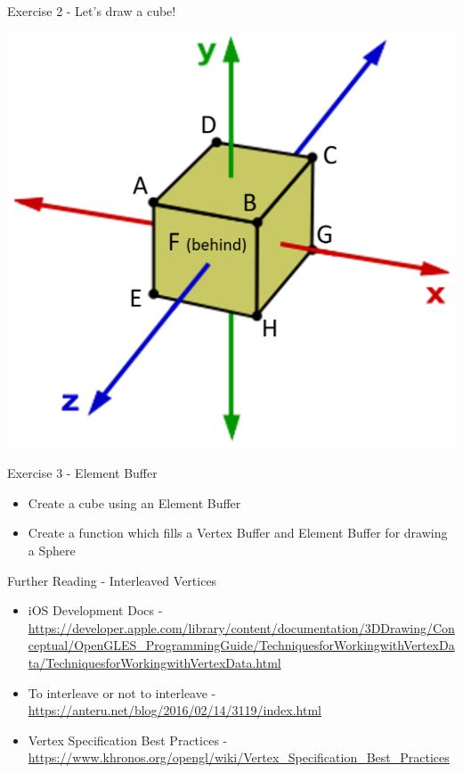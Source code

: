 \begin{frame}{Exercise 2 - Let's draw a cube!}
	\begin{center}
	\includegraphics[height=0.8\textheight]{cube_vertices}
	\end{center}
\end{frame}

\begin{frame}{Exercise 3 - Element Buffer}
	\begin{itemize}
		\item Create a cube using an Element Buffer
		\item Create a function which fills a Vertex Buffer and Element Buffer for drawing a Sphere
	\end{itemize}
\end{frame}

\begin{frame}{Further Reading - Interleaved Vertices}
	\begin{itemize}
		\item iOS Development Docs - \url{https://developer.apple.com/library/content/documentation/3DDrawing/Conceptual/OpenGLES_ProgrammingGuide/TechniquesforWorkingwithVertexData/TechniquesforWorkingwithVertexData.html}
		\item To interleave or not to interleave - \url{https://anteru.net/blog/2016/02/14/3119/index.html}
		\item Vertex Specification Best Practices - \url{https://www.khronos.org/opengl/wiki/Vertex_Specification_Best_Practices}
	\end{itemize}
\end{frame}


